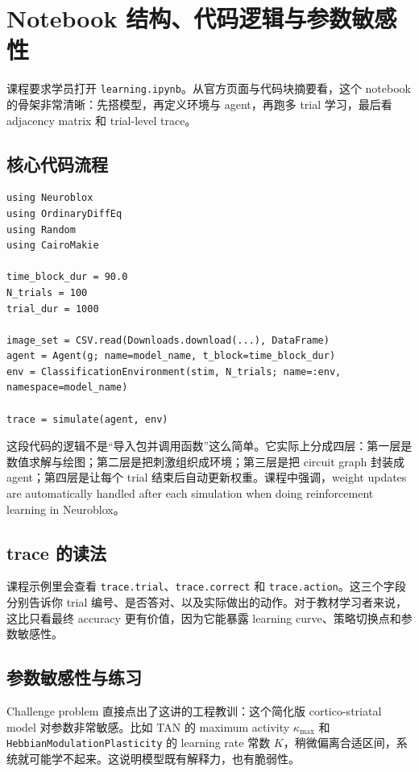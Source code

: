 \documentclass[a4paper]{article}
\begin{document}
\section{Notebook 结构、代码逻辑与参数敏感性}
课程要求学员打开 \texttt{learning.ipynb}。从官方页面与代码块摘要看，这个 notebook 的骨架非常清晰：先搭模型，再定义环境与 agent，再跑多 trial 学习，最后看 adjacency matrix 和 trial-level trace。

\subsection{核心代码流程}
\begin{lstlisting}
using Neuroblox
using OrdinaryDiffEq
using Random
using CairoMakie

time_block_dur = 90.0
N_trials = 100
trial_dur = 1000

image_set = CSV.read(Downloads.download(...), DataFrame)
agent = Agent(g; name=model_name, t_block=time_block_dur)
env = ClassificationEnvironment(stim, N_trials; name=:env, namespace=model_name)

trace = simulate(agent, env)
\end{lstlisting}

这段代码的逻辑不是“导入包并调用函数”这么简单。它实际上分成四层：第一层是数值求解与绘图；第二层是把刺激组织成环境；第三层是把 circuit graph 封装成 agent；第四层是让每个 trial 结束后自动更新权重。课程中强调，weight updates are automatically handled after each simulation when doing reinforcement learning in Neuroblox。

\subsection{trace 的读法}
课程示例里会查看 \texttt{trace.trial}、\texttt{trace.correct} 和 \texttt{trace.action}。这三个字段分别告诉你 trial 编号、是否答对、以及实际做出的动作。对于教材学习者来说，这比只看最终 accuracy 更有价值，因为它能暴露 learning curve、策略切换点和参数敏感性。

\subsection{参数敏感性与练习}
Challenge problem 直接点出了这讲的工程教训：这个简化版 cortico-striatal model 对参数非常敏感。比如 TAN 的 maximum activity $\kappa_{\max}$ 和 \texttt{HebbianModulationPlasticity} 的 learning rate 常数 $K$，稍微偏离合适区间，系统就可能学不起来。这说明模型既有解释力，也有脆弱性。
\end{document}
